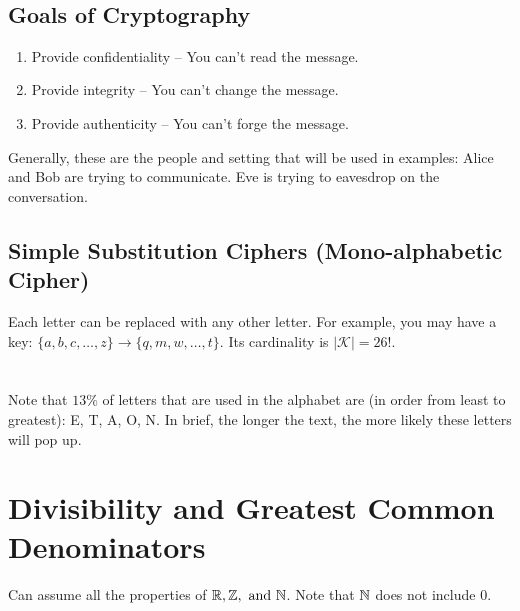  \\

\subsection{Goals of Cryptography}

\begin{enumerate}
    \item Provide confidentiality -- You can't read the message.
    \item Provide integrity -- You can't change the message.
    \item Provide authenticity -- You can't forge the message.
\end{enumerate}

Generally, these are the people and setting that will be used in examples: Alice and Bob are trying to communicate. Eve is trying to eavesdrop on the conversation. \\

\subsection{Simple Substitution Ciphers (Mono-alphabetic Cipher)}

Each letter can be replaced with any other letter. For example, you may have a key: $\{a,b,c,\dots,z\} \rightarrow \{q,m,w,\dots,t\}$. Its cardinality is $|\mathcal{K}| = 26!$. \\

 \\

 \\

 Note that $13\%$ of letters that are used in the alphabet are (in order from least to greatest): E, T, A, O, N. In brief, the longer the text, the more likely these letters will pop up.

\section{Divisibility and Greatest Common Denominators}

Can assume all the properties of $\mathbb{R}, \mathbb{Z}, \text{ and } \mathbb{N}$. Note that $\mathbb{N}$ does not include 0. \\

